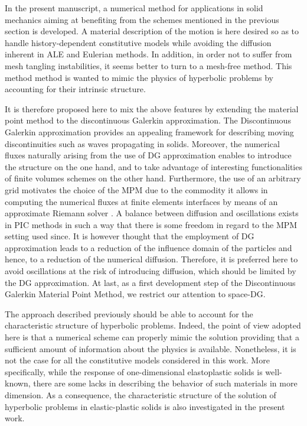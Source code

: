 In the present manuscript, a numerical method for applications in solid mechanics aiming at benefiting from the schemes mentioned in the previous section is developed.
A material description of the motion is here desired so as to handle history-dependent constitutive models while avoiding the diffusion inherent in ALE and Eulerian methods.
In addition, in order not to suffer from mesh tangling instabilities, it seems better to turn to a mesh-free method.
This method method is wanted to mimic the physics of hyperbolic problems by accounting for their intrinsic structure.

It is therefore proposed here to mix the above features by extending the material point method to the discontinuous Galerkin approximation.
The Discontinuous Galerkin approximation provides an appealing framework for describing moving discontinuities such as waves propagating in solids.
Moreover, the numerical fluxes naturally arising from the use of DG approximation enables to introduce the structure on the one hand, and to take advantage of interesting functionalities of finite volumes schemes on the other hand.
Furthermore, the use of an arbitrary grid motivates the choice of the MPM due to the commodity it allows in computing the numerical fluxes at finite elements interfaces by means of an approximate Riemann solver \cite{Toro}.
A balance between diffusion and oscillations exists in PIC methods in such a way that there is some freedom in regard to the MPM setting used since.
It is however thought that the employment of DG approximation leads to a reduction of the influence domain of the particles and hence, to a reduction of the numerical diffusion. 
Therefore, it is preferred here to avoid oscillations at the risk of introducing diffusion, which should be limited by the DG approximation.
At last, as a first development step of the Discontinuous Galerkin Material Point Method, we restrict our attention to space-DG.

The approach described previously should be able to account for the characteristic structure of hyperbolic problems.
Indeed, the point of view adopted here is that a numerical scheme can properly mimic the solution providing that a sufficient amount of information about the physics is available.
Nonetheless, it is not the case for all the constitutive models considered in this work.
More specifically, while the response of one-dimensional elastoplastic solids is well-known, there are some lacks in describing the behavior of such materials in more dimension. 
As a consequence, the characteristic structure of the solution of hyperbolic problems in elastic-plastic solids is also investigated in the present work.








